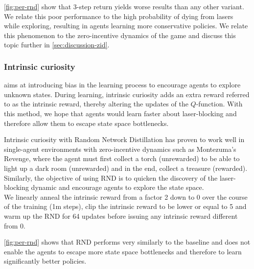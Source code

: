 \autoref{fig:per-rnd} show that 3-step return yields worse results than any other variant. We relate this poor performance to the high probability of dying from lasers while exploring, resulting in agents learning more conservative policies. We relate this phenomenon to the zero-incentive dynamics of the game and discuss this topic further in \autoref{sec:discussion-zid}. 

\subsubsection{Intrinsic curiosity} aims at introducing bias in the learning process to encourage agents to explore unknown states. During learning, intrinsic curiosity adds an extra reward referred to as the intrinsic reward, thereby altering the updates of the $Q$-function. With this method, we hope that agents would learn faster about laser-blocking and therefore allow them to escape state space bottlenecks.

Intrinsic curiosity with Random Network Distillation \citep[RND]{burda_exploration_2018_rnd} has proven to work well in single-agent environments with zero-incentive dynamics such as Montezuma's Revenge, where the agent must first collect a torch (unrewarded) to be able to light up a dark room (unrewarded) and in the end, collect a treasure (rewarded). Similarly, the objective of using RND is to quicken the discovery of the laser-blocking dynamic and encourage agents to explore the state space.\\
We linearly anneal the intrinsic reward from a factor 2 down to 0 over the course of the training (1m steps), clip the intrinsic reward to be lower or equal to 5 and warm up the RND for 64 updates before issuing any intrinsic reward different from 0.

\autoref{fig:per-rnd} shows that RND performs very similarly to the baseline and does not enable the agents to escape more state space bottlenecks and therefore to learn significantly better policies.

